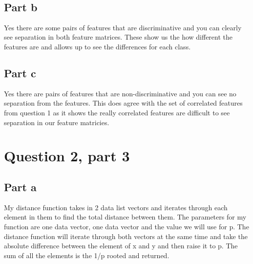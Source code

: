 \documentclass[11pt]{article}
\begin{document}
    \begin{center}
    \end{center}
    { \hspace*{\fill} \\}
    
    \subsection{Part b}\label{part-b}

Yes there are some pairs of features that are discriminative and you can
clearly see separation in both feature matrices. These show us the how
different the features are and allows up to see the differences for each
class.

    \subsection{Part c}\label{part-c}

Yes there are pairs of features that are non-discriminative and you can
see no separation from the features. This does agree with the set of
correlated features from question 1 as it shows the really correlated
features are difficult to see separation in our feature matricies.

    \section{Question 2, part 3}\label{question-2-part-3}

\subsection{Part a}\label{part-a}

My distance function takes in 2 data list vectors and iterates through
each element in them to find the total distance between them. The
parameters for my function are one data vector, one data vector and the
value we will use for p. The distance function will iterate through both
vectors at the same time and take the absolute difference between the
element of x and y and then raise it to p. The sum of all the elements
is the 1/p rooted and returned.
\end{document}
